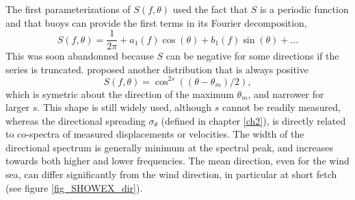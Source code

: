 The first parameterizations of $S(f,\theta)$ used the fact that $S$ is a periodic function 
and that buoys can provide the first terms in its Fourier decomposition, 
\begin{equation}
S(f,\theta)=\frac{1}{2\pi} + a_1(f) \cos(\theta) + b_1(f) \sin(\theta) + ... 
\end{equation}
This was soon abandonned because $S$ can be negative for some directions if the series is truncated. \cite{Longuet-Higgins&al.1963} proposed 
another distribution that is always positive  
\begin{equation}
   S(f,\theta)=\cos^{2s}\left((\theta-\theta_m)/2\right),
\end{equation}
which is symetric about the direction of the maximum $\theta_m$, and narrower for larger $s$. This shape is still widely used, 
although $s$ cannot be readily measured, whereas the directional spreading  $\sigma_\theta$ (defined in 
chapter \ref{ch2}), is directly related to co-spectra of measured displacements or velocities. 
The width of the directional spectrum is generally minimum at the spectral peak, and increases towards both higher 
and lower frequencies.  The mean direction, even for the wind sea, can differ significantly from the wind direction, 
in particular at short fetch (see figure
\ref{fig_SHOWEX_dir}).

